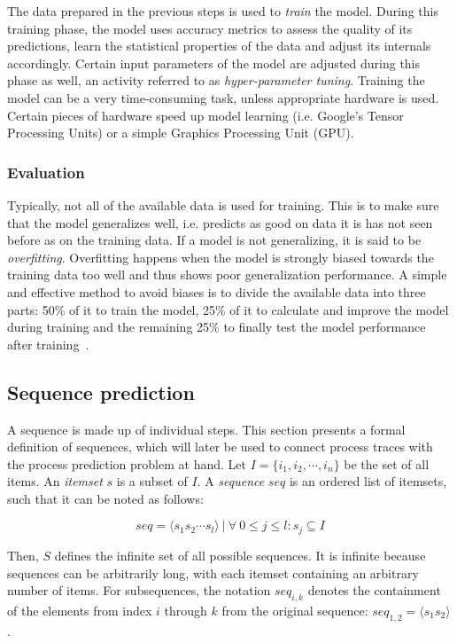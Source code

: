 The data prepared in the previous steps is used to \textit{train} the model. During this training phase, the model uses accuracy metrics to assess the quality of its predictions, learn the statistical properties of the data and adjust its internals accordingly. Certain input parameters of the model are adjusted during this phase as well, an activity referred to as \textit{hyper-parameter tuning}. Training the model can be a very time-consuming task, unless appropriate hardware is used. Certain pieces of hardware speed up model learning (i.e. Google's Tensor Processing Units) or a simple Graphics Processing Unit (GPU).

\subsubsection*{Evaluation}
Typically, not all of the available data is used for training. This is to make sure that the model generalizes well, i.e. predicts as good on data it is has not seen before as on the training data. If a model is not generalizing, it is said to be \textit{overfitting}. Overfitting happens when the model is strongly biased towards the training data too well and thus shows poor generalization performance. A simple and effective method to avoid biases is to divide the available data into three parts: 50\% of it to train the model, 25\% of it to calculate and improve the model during training and the remaining 25\% to finally test the model performance after training~\cite{kuhn2013applied, trevor2009elements}.

\subsection{Sequence prediction}\label{sec:background:sequence-prediction}
A sequence is made up of individual steps. This section presents a formal definition of sequences, which will later be used to connect process traces with the process prediction problem at hand. Let $I = \{i_1, i_2, \cdots, i_n\}$ be the set of all items. An \textit{itemset} $s$ is a subset of $I$. A \textit{sequence} $seq$ is an ordered list of itemsets, such that it can be noted as follows:

$$seq = \langle s_1s_2\cdots s_l \rangle\ |\ \forall\ 0 \leq j \leq l: s_j \subseteq I$$

Then, $S$ defines the infinite set of all possible sequences. It is infinite because sequences can be arbitrarily long, with each itemset containing an arbitrary number of items. For  subsequences, the notation $seq_{i,k}$ denotes the containment of the elements from index $i$ through $k$ from the original sequence: $seq_{1,2} = \langle s_1s_2 \rangle$.\\

